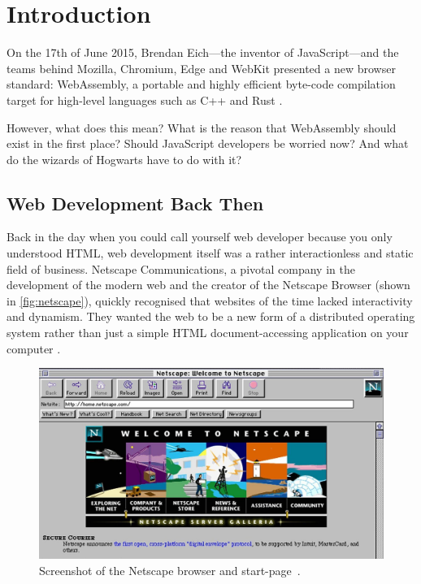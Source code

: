\documentclass[10pt]{article}  %
\newcommand{\floatcaption}[2]{\caption[#1.]{#1~#2.}}
\begin{document}
\begin{sloppypar}


  \section{Introduction}
  \label{sec:introduction}

  On the 17th of June 2015, Brendan Eich—the inventor of JavaScript—and the teams behind Mozilla, Chromium, Edge and WebKit presented a new browser standard: \mbox{WebAssembly}, a portable and highly efficient byte-code compilation target for high-level languages such as C++ and Rust \citep{eich_asmjs_2015}.

  However, what does this mean? What is the reason that WebAssembly should exist in the first place? Should JavaScript developers be worried now? And what do the wizards of Hogwarts have to do with it?

  \subsection{Web Development Back Then}
  \label{sec:back-then}

  Back in the day when you could call yourself web developer because you only understood HTML, web development itself was a rather interactionless and static field of business. Netscape Communications, a pivotal company in the development of the modern web and the creator of the Netscape Browser (shown in \autoref{fig:netscape}), quickly recognised that websites of the time lacked interactivity and dynamism. They wanted the web to be a new form of a distributed operating system rather than just a simple HTML document-accessing application on your computer \citep{cassel_brendan_2018}.

  \begin{figure}[ht]
    \centering
    \includegraphics[width=\textwidth]{figures/netscape.jpg}
    \floatcaption{Screenshot of the Netscape browser and start-page}{\citep{npr_home_nodate}}
    \label{fig:netscape}
  \end{figure}


\end{sloppypar}
\end{document}
